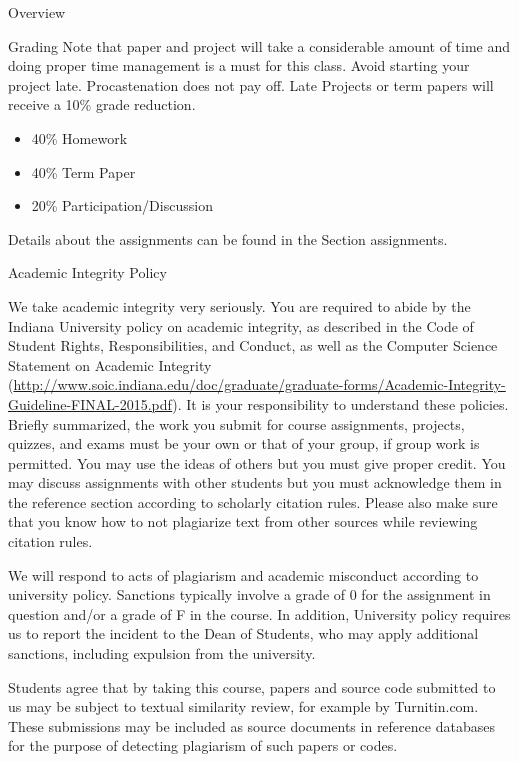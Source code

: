 \begin{edXchapter}{Overview}
\begin{edXsection}{Grading}
Note that paper and project will take a considerable amount of time and
doing proper time management is a must for this class. Avoid starting
your project late. Procastenation does not pay off. Late Projects or
term papers will receive a 10\% grade reduction.

\begin{itemize}
\itemsep1pt\parskip0pt
\item
  40\% Homework
\item
  40\% Term Paper
\item
  20\% Participation/Discussion
\end{itemize}

Details about the assignments can be found in the Section assignments.

\end{edXsection}
\begin{edXsection}{Academic Integrity Policy}\label{academic-integrity-policy}

We take academic integrity very seriously. You are required to abide by
the Indiana University policy on academic integrity, as described in the
Code of Student Rights, Responsibilities, and Conduct, as well as the
Computer Science Statement on Academic Integrity
(\url{http://www.soic.indiana.edu/doc/graduate/graduate-forms/Academic-Integrity-Guideline-FINAL-2015.pdf}).
It is your responsibility to understand these policies. Briefly
summarized, the work you submit for course assignments, projects,
quizzes, and exams must be your own or that of your group, if group work
is permitted. You may use the ideas of others but you must give proper
credit. You may discuss assignments with other students but you must
acknowledge them in the reference section according to scholarly
citation rules. Please also make sure that you know how to not
plagiarize text from other sources while reviewing citation rules.

We will respond to acts of plagiarism and academic misconduct according
to university policy. Sanctions typically involve a grade of 0 for the
assignment in question and/or a grade of F in the course. In addition,
University policy requires us to report the incident to the Dean of
Students, who may apply additional sanctions, including expulsion from
the university.

Students agree that by taking this course, papers and source code
submitted to us may be subject to textual similarity review, for example
by Turnitin.com. These submissions may be included as source documents
in reference databases for the purpose of detecting plagiarism of such
papers or codes.


\end{edXsection}
\end{edXchapter}
